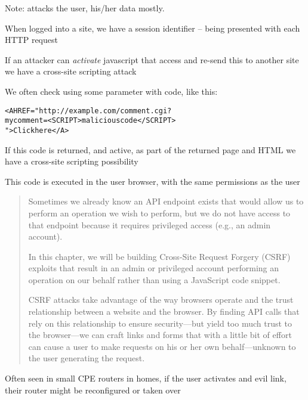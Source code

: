 \documentclass[Screen16to9,17pt]{foils}
\begin{document}
Note: attacks the user, his/her data mostly.


\begin{list1}
\item When logged into a site, we have a session identifier -- being presented with each HTTP request
\item If an attacker can \emph{activate} javascript that access and re-send this to another site we have a cross-site scripting attack
\item We often check using some parameter with code, like this:
\begin{alltt}\footnotesize
<A HREF="http://example.com/comment.cgi?
mycomment=<SCRIPT>malicious code</SCRIPT>
">Click here</A>
\end{alltt}
\item If this code is returned, and active, as part of the returned page and HTML we have a cross-site scripting possibility
\item This code is executed in the user browser, with the same permissions as the user
\end{list1}


\begin{quote}
Sometimes we already know an API endpoint exists that would allow us to perform an operation we wish to perform, but we do not have access to that endpoint because it requires privileged access (e.g., an admin account).

In this chapter, we will be building Cross-Site Request Forgery (CSRF) exploits that result in an admin or privileged account performing an operation on our behalf rather than using a JavaScript code snippet.

CSRF attacks take advantage of the way browsers operate and the trust relationship between a website and the browser. By finding API calls that rely on this relationship to ensure security—but yield too much trust to the browser—we can craft links and forms that with a little bit of effort can cause a user to make requests on his or her own behalf—unknown to the user generating the request.
\end{quote}

\begin{list2}
  \item Often seen in small CPE routers in homes, if the user activates and evil link, their router might be reconfigured or taken over
\end{list2}
\end{document}
